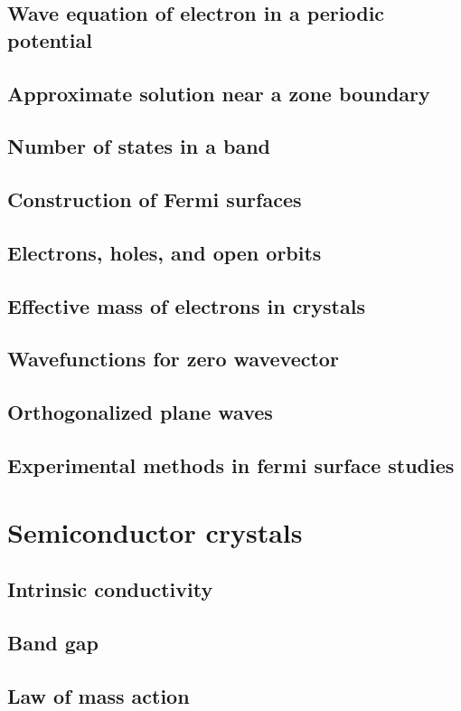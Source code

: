 \section{Wave equation of electron in a periodic potential}
\section{Approximate solution near a zone boundary}
\section{Number of states in a band}
\section{Construction of Fermi surfaces}
\section{Electrons, holes, and open orbits}
\section{Effective mass of electrons in crystals}
\section{Wavefunctions for zero wavevector}
\section{Orthogonalized plane waves}
\section{Experimental methods in fermi surface studies}

\chapter{Semiconductor crystals}
\section{Intrinsic conductivity}
\section{Band gap}
\section{Law of mass action}

